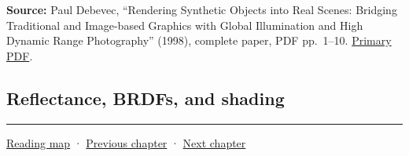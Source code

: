\textbf{Source:} Paul Debevec, ``Rendering Synthetic Objects into Real Scenes: Bridging Traditional and Image-based Graphics with Global Illumination and High Dynamic Range Photography'' (1998), complete paper, PDF pp.~1--10. \href{https://www.pauldebevec.com/Research/IBL/debevec-siggraph98.pdf}{Primary PDF}.

\subsection{Reflectance, BRDFs, and shading}\label{reflectance-brdfs-and-shading}

\begin{center}\rule{0.5\linewidth}{0.5pt}\end{center}

\href{Chapter\%20Edition/02\%20-\%20Graphics\%20Vision\%20and\%20XR/00\%20-\%20Reading\%20Map}{Reading map} · \hyperref[03-visual-computing-i-ch003]{Previous chapter} · \hyperref[03-visual-computing-i-ch005]{Next chapter}
